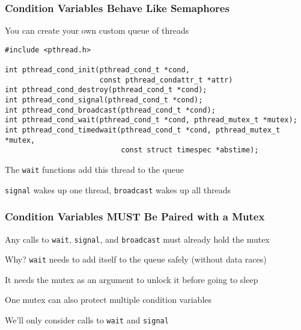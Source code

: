   \begin{frame}[fragile]
    \frametitle{Condition Variables Behave Like Semaphores}

    You can create your own custom queue of threads

    \vspace{2em}

    \begin{lstlisting}
#include <pthread.h>

int pthread_cond_init(pthread_cond_t *cond,
                      const pthread_condattr_t *attr)
int pthread_cond_destroy(pthread_cond_t *cond);
int pthread_cond_signal(pthread_cond_t *cond);
int pthread_cond_broadcast(pthread_cond_t *cond);
int pthread_cond_wait(pthread_cond_t *cond, pthread_mutex_t *mutex);
int pthread_cond_timedwait(pthread_cond_t *cond, pthread_mutex_t *mutex,
                           const struct timespec *abstime);
    \end{lstlisting}

    \vspace{2em}

    The \texttt{wait} functions add this thread to the queue

    \hspace{2em} \texttt{signal} wakes up one thread, \texttt{broadcast} wakes
    up all threads
  \end{frame}

  \begin{frame}
    \frametitle{Condition Variables MUST Be Paired with a Mutex}

    Any calls to \texttt{wait}, \texttt{signal}, and \texttt{broadcast} must
    already hold the mutex

    \vspace{2em}

    Why? \texttt{wait} needs to add itself to the queue safely (without data
    races)

    \hspace{2em} It needs the mutex as an argument to unlock it before going to
    sleep

    \vspace{2em}

    One mutex can also protect multiple condition variables

    \vspace{2em}

    We'll only consider calls to \texttt{wait} and \texttt{signal}
  \end{frame}

